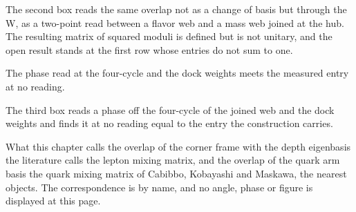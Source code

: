 The second box reads the same overlap not as a change of basis but through the W, as a two-point read between a flavor web and a mass web joined at the hub. The resulting matrix of squared moduli is defined but is not unitary, and the open result stands at the first row whose entries do not sum to one.
\begin{chwall}\label{box:VI-7-mixing-the-washed-overlap-and-the-ckm-block:3}
The phase read at the four-cycle and the dock weights meets the measured entry at no reading.
\end{chwall}
The third box reads a phase off the four-cycle of the joined web and the dock weights and finds it at no reading equal to the entry the construction carries.
\begin{chbridge}
What this chapter calls the overlap of the corner frame with the depth eigenbasis the literature calls the lepton mixing matrix, and the overlap of the quark arm basis the quark mixing matrix of Cabibbo, Kobayashi and Maskawa, the nearest objects. The correspondence is by name, and no angle, phase or figure is displayed at this page.
\end{chbridge}
